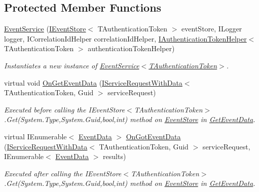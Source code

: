 \subsection*{Protected Member Functions}
\begin{DoxyCompactItemize}
\item 
\hyperlink{classCqrs_1_1Services_1_1EventService_ac5896c2eb4efbdb42b3cad774b688e45_ac5896c2eb4efbdb42b3cad774b688e45}{Event\+Service} (\hyperlink{interfaceCqrs_1_1Events_1_1IEventStore}{I\+Event\+Store}$<$ T\+Authentication\+Token $>$ event\+Store, I\+Logger logger, I\+Correlation\+Id\+Helper correlation\+Id\+Helper, \hyperlink{interfaceCqrs_1_1Authentication_1_1IAuthenticationTokenHelper}{I\+Authentication\+Token\+Helper}$<$ T\+Authentication\+Token $>$ authentication\+Token\+Helper)
\begin{DoxyCompactList}\small\item\em Instantiates a new instance of \hyperlink{classCqrs_1_1Services_1_1EventService_ac5896c2eb4efbdb42b3cad774b688e45_ac5896c2eb4efbdb42b3cad774b688e45}{Event\+Service$<$\+T\+Authentication\+Token$>$}. \end{DoxyCompactList}\item 
virtual void \hyperlink{classCqrs_1_1Services_1_1EventService_a1556310c97fbf05df7804d53f91f8511_a1556310c97fbf05df7804d53f91f8511}{On\+Get\+Event\+Data} (\hyperlink{interfaceCqrs_1_1Services_1_1IServiceRequestWithData}{I\+Service\+Request\+With\+Data}$<$ T\+Authentication\+Token, Guid $>$ service\+Request)
\begin{DoxyCompactList}\small\item\em Executed before calling the I\+Event\+Store$<$\+T\+Authentication\+Token$>$.\+Get(\+System.\+Type,\+System.\+Guid,bool,int) method on \hyperlink{namespaceCqrs_1_1EventStore}{Event\+Store} in \hyperlink{classCqrs_1_1Services_1_1EventService_a9a68d774ac754e39be56d3e0449f14d7_a9a68d774ac754e39be56d3e0449f14d7}{Get\+Event\+Data}. \end{DoxyCompactList}\item 
virtual I\+Enumerable$<$ \hyperlink{classCqrs_1_1Events_1_1EventData}{Event\+Data} $>$ \hyperlink{classCqrs_1_1Services_1_1EventService_a16030e800b05cea77fd2183db7296804_a16030e800b05cea77fd2183db7296804}{On\+Got\+Event\+Data} (\hyperlink{interfaceCqrs_1_1Services_1_1IServiceRequestWithData}{I\+Service\+Request\+With\+Data}$<$ T\+Authentication\+Token, Guid $>$ service\+Request, I\+Enumerable$<$ \hyperlink{classCqrs_1_1Events_1_1EventData}{Event\+Data} $>$ results)
\begin{DoxyCompactList}\small\item\em Executed after calling the I\+Event\+Store$<$\+T\+Authentication\+Token$>$.\+Get(\+System.\+Type,\+System.\+Guid,bool,int) method on \hyperlink{namespaceCqrs_1_1EventStore}{Event\+Store} in \hyperlink{classCqrs_1_1Services_1_1EventService_a9a68d774ac754e39be56d3e0449f14d7_a9a68d774ac754e39be56d3e0449f14d7}{Get\+Event\+Data}. \end{DoxyCompactList}\item 

\end{DoxyCompactItemize}
